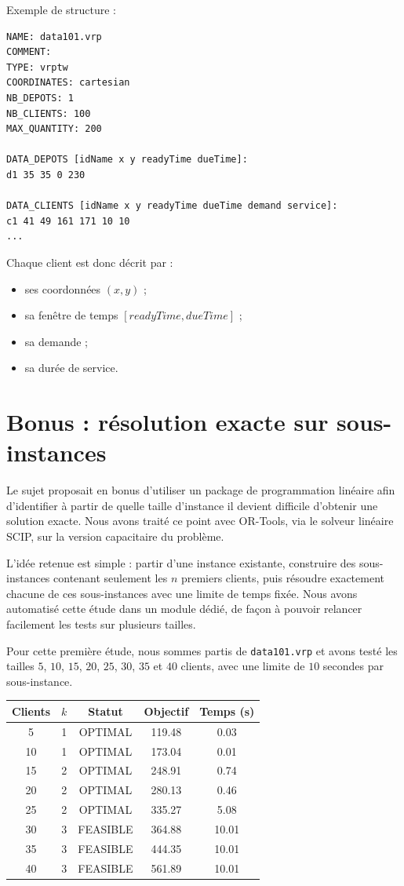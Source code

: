 \documentclass[11pt,a4paper]{article}
\begin{document}
Exemple de structure :
\begin{lstlisting}
NAME: data101.vrp
COMMENT:
TYPE: vrptw
COORDINATES: cartesian
NB_DEPOTS: 1
NB_CLIENTS: 100
MAX_QUANTITY: 200

DATA_DEPOTS [idName x y readyTime dueTime]:
d1 35 35 0 230

DATA_CLIENTS [idName x y readyTime dueTime demand service]:
c1 41 49 161 171 10 10
...
\end{lstlisting}

Chaque client est donc décrit par :
\begin{itemize}
    \item ses coordonnées \((x,y)\) ;
    \item sa fenêtre de temps \([readyTime, dueTime]\) ;
    \item sa demande ;
    \item sa durée de service.
\end{itemize}

\section{Bonus : résolution exacte sur sous-instances}

Le sujet proposait en bonus d'utiliser un package de programmation linéaire afin d'identifier à partir de quelle taille d'instance il devient difficile d'obtenir une solution exacte. Nous avons traité ce point avec OR-Tools, via le solveur linéaire SCIP, sur la version capacitaire du problème.

L'idée retenue est simple : partir d'une instance existante, construire des sous-instances contenant seulement les \(n\) premiers clients, puis résoudre exactement chacune de ces sous-instances avec une limite de temps fixée. Nous avons automatisé cette étude dans un module dédié, de façon à pouvoir relancer facilement les tests sur plusieurs tailles.

Pour cette première étude, nous sommes partis de \texttt{data101.vrp} et avons testé les tailles \(5\), \(10\), \(15\), \(20\), \(25\), \(30\), \(35\) et \(40\) clients, avec une limite de \(10\) secondes par sous-instance.

\begin{center}
\begin{tabular}{ccccc}
\toprule
Clients & \(k\) & Statut & Objectif & Temps (s) \\
\midrule
5  & 1 & OPTIMAL  & 119.48 & 0.03 \\
10 & 1 & OPTIMAL  & 173.04 & 0.01 \\
15 & 2 & OPTIMAL  & 248.91 & 0.74 \\
20 & 2 & OPTIMAL  & 280.13 & 0.46 \\
25 & 2 & OPTIMAL  & 335.27 & 5.08 \\
30 & 3 & FEASIBLE & 364.88 & 10.01 \\
35 & 3 & FEASIBLE & 444.35 & 10.01 \\
40 & 3 & FEASIBLE & 561.89 & 10.01 \\
\bottomrule
\end{tabular}
\end{center}
\end{document}

